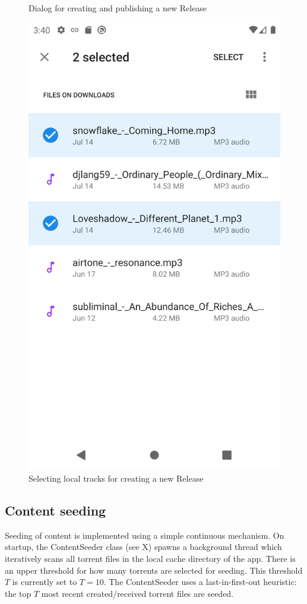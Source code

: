 \begin{figure}
        \caption{Dialog for creating and publishing a new Release}
        \label{fig:submit-release-dialog}
    \endminipage\hfill
        \includegraphics[width=\linewidth]{implementation/screenshot-submit-release.png}
        \caption{Selecting local tracks for creating a new Release}
        \label{fig:select-tracks}
    \endminipage\hfill
    \endminipage
\end{figure}
\subsection{Content seeding}
\label{sec:content-seeding}
Seeding of content is implemented using a simple continuous mechanism. On startup, the ContentSeeder class (see X) spawns a background thread which iteratively scans all torrent files in the local cache directory of the app. There is an upper threshold for how many torrents are selected for seeding. This threshold \(T\) is currently set to \(T=10\). The ContentSeeder uses a last-in-first-out heuristic: the top \(T\) most recent created/received torrent files are seeded.
